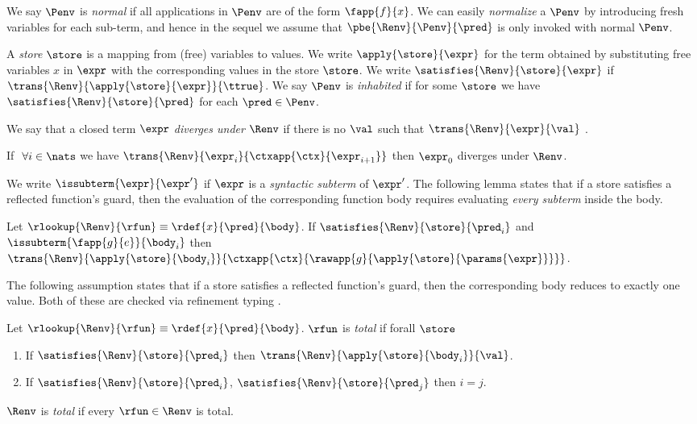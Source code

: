 %
We say $\Penv$ is \emph{normal}
if all applications in $\Penv$ are
of the form $\fapp{f}{x}$.
%
We can easily \emph{normalize}
a $\Penv$ by introducing fresh
variables for each sub-term, and
hence in the sequel we assume
that $\pbe{\Renv}{\Penv}{\pred}$
is only invoked with normal $\Penv$.

%
A \emph{store} $\store$ is a mapping from
(free) variables to values.
%
We write $\apply{\store}{\expr}$ for the term
obtained by substituting free variables $x$
in $\expr$ with the corresponding values in
the store $\store$.
%
We write $\satisfies{\Renv}{\store}{\expr}$
if $\trans{\Renv}{\apply{\store}{\expr}}{\ttrue}$.
%
We say $\Penv$ is \emph{inhabited}
if for some $\store$ we have
$\satisfies{\Renv}{\store}{\pred}$
for each $\pred \in \Penv$.


%
We say that a closed term $\expr$
\emph{diverges under} $\Renv$ if
there is no $\val$ such that
$\trans{\Renv}{\expr}{\val}$ .

\begin{lemma} \label{lem:div} %
If $\ \forall i \in \nats$ we have
$\trans{\Renv}{\expr_i}{\ctxapp{\ctx}{\expr_{i+1}}}$
then $\expr_0$ diverges under $\Renv$.
\end{lemma}

%
We write $\issubterm{\expr}{\expr'}$
if $\expr$ is a \emph{syntactic subterm}
of $\expr'$.
%
The following lemma states that
if a store satisfies a reflected
function's guard, then the evaluation
of the corresponding function body
requires evaluating \emph{every subterm}
inside the body.

\begin{lemma}\label{lem:subterm-eval}
Let $\rlookup{\Renv}{\rfun} \equiv \rdef{x}{\pred}{\body}$.
%
If $\satisfies{\Renv}{\store}{\pred_i}$ and $\issubterm{\fapp{g}{e}}{\body_i}$
then
$\trans{\Renv}{\apply{\store}{\body_i}}
              {\ctxapp{\ctx}{\rawapp{g}{\apply{\store}{\params{\expr}}}}}$.
\end{lemma}

%
The following assumption states that
if a store satisfies a reflected function's
guard, then the corresponding body reduces
to exactly one value.
%
Both of these are checked via
refinement typing \cite{Vazou14}.
%

\begin{lemma}\label{asm:total}
Let $\rlookup{\Renv}{\rfun} \equiv \rdef{x}{\pred}{\body}$.
%
$\rfun$ is \emph{total} if forall $\store$
%
\begin{enumerate}
\item If $\satisfies{\Renv}{\store}{\pred_i}$ then $\trans{\Renv}{\apply{\store}{\body_i}}{\val}$.
\item If $\satisfies{\Renv}{\store}{\pred_i}$, $\satisfies{\Renv}{\store}{\pred_j}$ then $i=j$.
\end{enumerate}
%
$\Renv$ is \emph{total} if every $\rfun \in \Renv$ is total.
%
\end{lemma}



